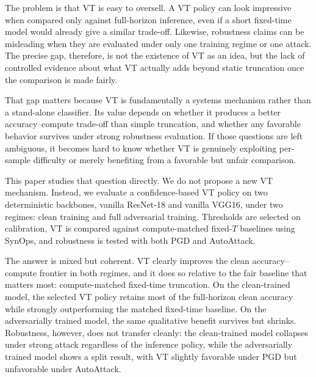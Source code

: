 \documentclass[11pt]{article}
\begin{document}
The problem is that VT is easy to oversell. A VT policy can look impressive when compared only against full-horizon inference, even if a short fixed-time model would already give a similar trade-off. Likewise, robustness claims can be misleading when they are evaluated under only one training regime or one attack. The precise gap, therefore, is not the existence of VT as an idea, but the lack of controlled evidence about what VT actually adds beyond static truncation once the comparison is made fairly.

That gap matters because VT is fundamentally a systems mechanism rather than a stand-alone classifier. Its value depends on whether it produces a better accuracy--compute trade-off than simple truncation, and whether any favorable behavior survives under strong robustness evaluation. If those questions are left ambiguous, it becomes hard to know whether VT is genuinely exploiting per-sample difficulty or merely benefiting from a favorable but unfair comparison.

This paper studies that question directly. We do not propose a new VT mechanism. Instead, we evaluate a confidence-based VT policy on two deterministic backbones, vanilla ResNet-18 and vanilla VGG16, under two regimes: clean training and full adversarial training. Thresholds are selected on calibration, VT is compared against compute-matched fixed-$T$ baselines using SynOps, and robustness is tested with both PGD and AutoAttack.

The answer is mixed but coherent. VT clearly improves the clean accuracy--compute frontier in both regimes, and it does so relative to the fair baseline that matters most: compute-matched fixed-time truncation. On the clean-trained model, the selected VT policy retains most of the full-horizon clean accuracy while strongly outperforming the matched fixed-time baseline. On the adversarially trained model, the same qualitative benefit survives but shrinks. Robustness, however, does not transfer cleanly: the clean-trained model collapses under strong attack regardless of the inference policy, while the adversarially trained model shows a split result, with VT slightly favorable under PGD but unfavorable under AutoAttack.
\end{document}
